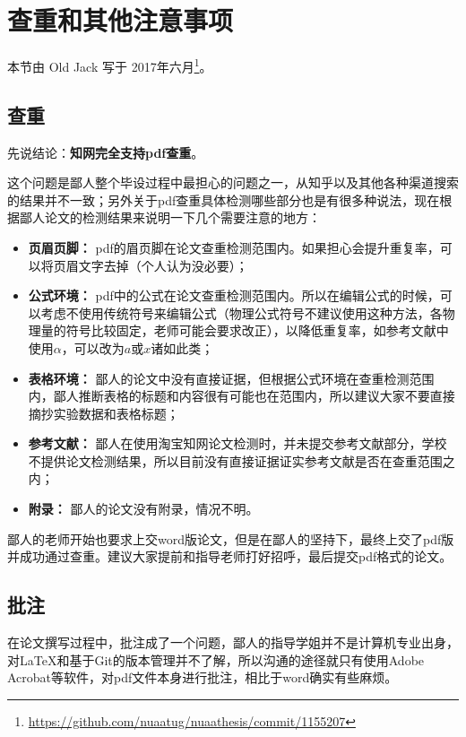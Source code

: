 \chapter{查重和其他注意事项}

本节由 Old Jack 写于 2017年六月\footnote{\url{https://github.com/nuaatug/nuaathesis/commit/1155207}}。

\section{查重}

先说结论：{\large\textbf{知网完全支持pdf查重}}。

这个问题是鄙人整个毕设过程中最担心的问题之一，从知乎以及其他各种渠道搜索的结果并不一致；另外关于pdf查重具体检测哪些部分也是有很多种说法，现在根据鄙人论文的检测结果来说明一下几个需要注意的地方：

\begin{itemize}
  \item \textbf{页眉页脚：} pdf的眉页脚在论文查重检测范围内。如果担心会提升重复率，可以将页眉文字去掉（个人认为没必要）；
  \item \textbf{公式环境：} pdf中的公式在论文查重检测范围内。所以在编辑公式的时候，可以考虑不使用传统符号来编辑公式（物理公式符号不建议使用这种方法，各物理量的符号比较固定，老师可能会要求改正），以降低重复率，如参考文献中使用$\alpha$，可以改为$a$或$x$诸如此类；
  \item \textbf{表格环境：} 鄙人的论文中没有直接证据，但根据公式环境在查重检测范围内，鄙人推断表格的标题和内容很有可能也在范围内，所以建议大家不要直接摘抄实验数据和表格标题；
  \item \textbf{参考文献：} 鄙人在使用淘宝知网论文检测时，并未提交参考文献部分，学校不提供论文检测结果，所以目前没有直接证据证实参考文献是否在查重范围之内；
  \item \textbf{附录：} 鄙人的论文没有附录，情况不明。
\end{itemize}

鄙人的老师开始也要求上交word版论文，但是在鄙人的坚持下，最终上交了pdf版并成功通过查重。建议大家提前和指导老师打好招呼，最后提交pdf格式的论文。

\section{批注}
在论文撰写过程中，批注成了一个问题，鄙人的指导学姐并不是计算机专业出身，对\LaTeX 和基于Git的版本管理并不了解，所以沟通的途径就只有使用Adobe Acrobat等软件，对pdf文件本身进行批注，相比于word确实有些麻烦。

